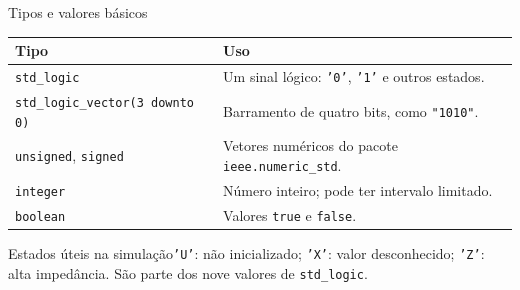 \begin{frame}[t]{Tipos e valores básicos}
\footnotesize
\begin{tabularx}{\textwidth}{lX}
\toprule Tipo & Uso\\\midrule
\texttt{std\_logic} & Um sinal lógico: \texttt{'0'}, \texttt{'1'} e outros estados.\\
\texttt{std\_logic\_vector(3 downto 0)} & Barramento de quatro bits, como \texttt{"1010"}.\\
\texttt{unsigned}, \texttt{signed} & Vetores numéricos do pacote \texttt{ieee.numeric\_std}.\\
\texttt{integer} & Número inteiro; pode ter intervalo limitado.\\
\texttt{boolean} & Valores \texttt{true} e \texttt{false}.\\\bottomrule
\end{tabularx}
\begin{block}{Estados úteis na simulação}\texttt{'U'}: não inicializado; \texttt{'X'}: valor desconhecido; \texttt{'Z'}: alta impedância. São parte dos nove valores de \texttt{std\_logic}.\end{block}

\end{frame}
